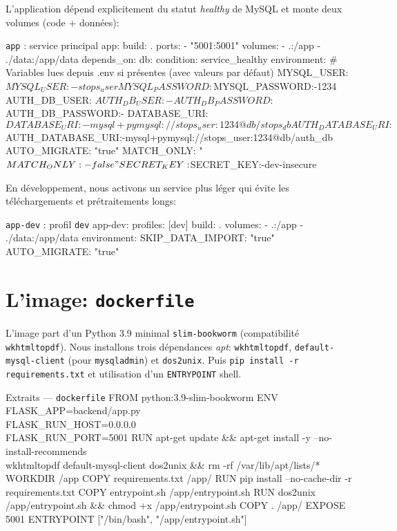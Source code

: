\noindent L'application dépend explicitement du statut \textit{healthy} de MySQL et monte deux volumes (code + données):

\begin{codebox}{\texttt{app} : service principal}
  app:
    build: .
    ports:
      - "5001:5001"
    volumes:
      - .:/app
      - ./data:/app/data
    depends_on:
      db:
        condition: service_healthy
    environment:
      # Variables lues depuis .env si présentes (avec valeurs par défaut)
      MYSQL_USER: ${MYSQL_USER:-stops_user}
      MYSQL_PASSWORD: ${MYSQL_PASSWORD:-1234}
      AUTH_DB_USER: ${AUTH_DB_USER:-}
      AUTH_DB_PASSWORD: ${AUTH_DB_PASSWORD:-}
      DATABASE_URI: ${DATABASE_URI:-mysql+pymysql://stops_user:1234@db/stops_db}
      AUTH_DATABASE_URI: ${AUTH_DATABASE_URI:-mysql+pymysql://stops_user:1234@db/auth_db}
      AUTO_MIGRATE: "true"
      MATCH_ONLY: "${MATCH_ONLY:-false}"
      SECRET_KEY: ${SECRET_KEY:-dev-insecure}
\end{codebox}

\noindent En développement, nous activons un service plus léger qui évite les téléchargements et prétraitements longs:

\begin{codebox}{\texttt{app-dev} : profil \texttt{dev}}
  app-dev:
    profiles: [dev]
    build: .
    volumes:
      - .:/app
      - ./data:/app/data
    environment:
      SKIP_DATA_IMPORT: "true"
      AUTO_MIGRATE: "true"
\end{codebox}

\section{L'image: \texttt{dockerfile}}

L'image part d'un Python 3.9 minimal \texttt{slim-bookworm} (compatibilité \texttt{wkhtmltopdf}). Nous installons trois dépendances \textit{apt}: \texttt{wkhtmltopdf}, \texttt{default-mysql-client} (pour \texttt{mysqladmin}) et \texttt{dos2unix}. Puis \texttt{pip install -r requirements.txt} et utilisation d'un \texttt{ENTRYPOINT} shell.

\begin{codebox}[language=bash]{Extraits — \texttt{dockerfile}}
FROM python:3.9-slim-bookworm
ENV FLASK_APP=backend/app.py \\
    FLASK_RUN_HOST=0.0.0.0 \\
    FLASK_RUN_PORT=5001
RUN apt-get update && apt-get install -y --no-install-recommends \\
    wkhtmltopdf default-mysql-client dos2unix && rm -rf /var/lib/apt/lists/*
WORKDIR /app
COPY requirements.txt /app/
RUN pip install --no-cache-dir -r requirements.txt
COPY entrypoint.sh /app/entrypoint.sh
RUN dos2unix /app/entrypoint.sh && chmod +x /app/entrypoint.sh
COPY . /app/
EXPOSE 5001
ENTRYPOINT ["/bin/bash", "/app/entrypoint.sh"]
\end{codebox}

